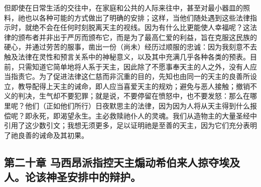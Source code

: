 但即使在日常生活的交往中，在家庭和公共的人际来往中，甚至对最小器皿的照料，祂也以各种可能的方式做出了明确的安排；这样，当他们随处遇到这些法律指示时，就绝不会在任何时刻脱离天主的视线。因为有什么比更能使人幸福呢？这法律的颁布者并非出于严厉而颁布它，而是为了最高仁爱的利益，旨在克服这民族的硬心，并通过劳苦的服事，凿出一份（尚未）经历过顺服的忠诚：因为我刻意不去触及法律在灵性和预言关系中的神秘意义，以及其中充满几乎各种各类的预表。目前，只需知道它简单地将人系于天主，因此除了不愿事奉天主的人之外，没有人应当指责它。为了促进法律这仁慈而非沉重的目的，先知也由同一的天主的良善所设立，教导配得上天主的诫命，即人应当喜爱天主的规劝；避免与恶人接触；撤销不义的判决，生气却不要犯罪；就是说，不要停留在愤怒中，也不要发怒：那么在哪里呢？他们（正如他们所行）日夜默思主的法律，因为因为人将从天主得到什么报偿呢？即永死，即渴望永生。主必救赎祂仆人的灵魂。我们从造物主的大量圣经中引用了这少数引文；我想无须更多，足以证明祂是至善的天主，因为它们充分表明了祂良善的诫命及其初果。\par


\subsection{第二十章 马西昂派指控天主煽动希伯来人掠夺埃及人。论该神圣安排中的辩护。}

